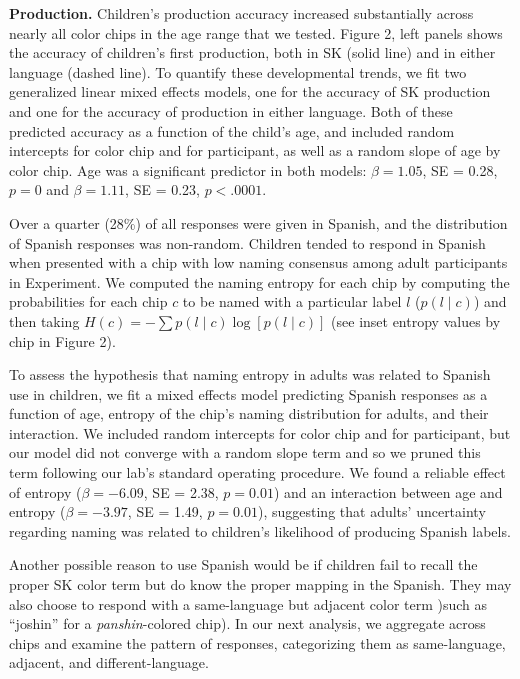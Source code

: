 \documentclass[,man,floatsintext]{apa6}
\theoremstyle{definition}
\theoremstyle{definition}
\theoremstyle{definition}
\theoremstyle{remark}
\begin{document}
\textbf{Production.} Children's production accuracy increased
substantially across nearly all color chips in the age range that we
tested. Figure 2, left panels shows the accuracy of children's first
production, both in SK (solid line) and in either language (dashed
line). To quantify these developmental trends, we fit two generalized
linear mixed effects models, one for the accuracy of SK production and
one for the accuracy of production in either language. Both of these
predicted accuracy as a function of the child's age, and included random
intercepts for color chip and for participant, as well as a random slope
of age by color chip. Age was a significant predictor in both models:
\(\beta = 1.05\), SE = 0.28, \(p = 0\) and \(\beta = 1.11\), SE = 0.23,
\(p < .0001\).

Over a quarter (28\%) of all responses were given in Spanish, and the
distribution of Spanish responses was non-random. Children tended to
respond in Spanish when presented with a chip with low naming consensus
among adult participants in Experiment. We computed the naming entropy
for each chip by computing the probabilities for each chip \(c\) to be
named with a particular label \(l\) (\(p(l \mid c)\)) and then taking
\(H(c) = - \sum{p(l\mid c) \log[p(l \mid c)]}\) (see inset entropy
values by chip in Figure 2).

To assess the hypothesis that naming entropy in adults was related to
Spanish use in children, we fit a mixed effects model predicting Spanish
responses as a function of age, entropy of the chip's naming
distribution for adults, and their interaction. We included random
intercepts for color chip and for participant, but our model did not
converge with a random slope term and so we pruned this term following
our lab's standard operating procedure. We found a reliable effect of
entropy (\(\beta = -6.09\), SE = 2.38, \(p = 0.01\)) and an interaction
between age and entropy (\(\beta = -3.97\), SE = 1.49, \(p = 0.01\)),
suggesting that adults' uncertainty regarding naming was related to
children's likelihood of producing Spanish labels.

Another possible reason to use Spanish would be if children fail to
recall the proper SK color term but do know the proper mapping in the
Spanish. They may also choose to respond with a same-language but
adjacent color term )such as \enquote{joshin} for a
\emph{panshin}-colored chip). In our next analysis, we aggregate across
chips and examine the pattern of responses, categorizing them as
same-language, adjacent, and different-language.
\end{document}
